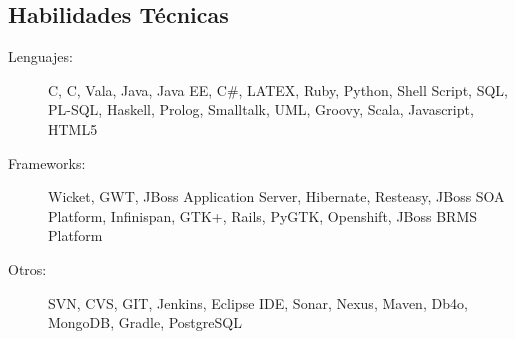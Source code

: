 \documentclass[11pt,4apaper]{article}
\newenvironment{indentsection}[1]%
{\begin{list}{}%
    {\setlength{\leftmargin}{#1}}%
    \item[]%
}
{\end{list}}
\newcommand{\CPP}
{C\nolinebreak[4]\hspace{-.05em}\raisebox{.22ex}{\footnotesize\bf ++}}
\begin{document}
\subsection*{Habilidades Técnicas}

\begin{indentsection}{\parindent}
\begin{description}
  \item[Lenguajes:]
C, \CPP, Vala, Java, Java EE, C\#, LATEX, Ruby, Python, Shell Script, SQL, PL-SQL,
Haskell, Prolog, Smalltalk, UML, Groovy, Scala, Javascript, HTML5

  \item[Frameworks:]
Wicket, GWT, JBoss Application Server, Hibernate, Resteasy,
JBoss SOA Platform, Infinispan, GTK+, Rails, PyGTK, Openshift, JBoss BRMS Platform 


\item[Otros:]
SVN, CVS, GIT, Jenkins, Eclipse IDE, Sonar, Nexus, Maven, Db4o, MongoDB, Gradle, PostgreSQL
\end{description}
    
\end{indentsection}

    
\end{document}
